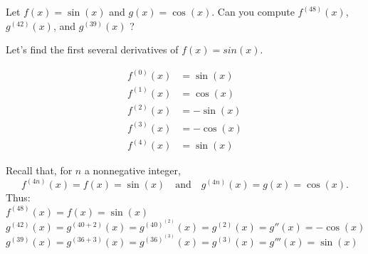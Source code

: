 \documentclass[nooutcomes]{ximera}
\begin{document}
\begin{problem}
Let $f(x) = \sin(x)$ and $g(x) = \cos(x)$.  Can you compute $f^{(48)}(x)$, $g^{(42)}(x)$, and $g^{(39)}(x)$ ?  

\begin{freeResponse}
Let's find the first several derivatives of $f(x)=sin(x)$.

	\begin{align*}
	f^{(0)}(x)&=\sin(x)\\
	f^{(1)}(x)&=\cos(x)\\
	f^{(2)}(x)&=-\sin(x)\\
	f^{(3)}(x)&=-\cos(x)\\
	f^{(4)}(x)&=\sin(x)
	\end{align*}

  Recall that, for $n$ a nonnegative integer,
  $$f^{(4n)}(x) = f(x) = \sin(x) \quad \text{and} \quad g^{(4n)}(x) = g(x) = \cos(x).$$
  Thus: \\ 
  $f^{(48)}(x) =f(x)= \sin(x)$ \\
 $g^{(42)}(x) =g^{(40+2)}(x)=g^{(40)^{(2)}}(x)= g^{(2)}(x) = g''(x) = - \cos(x)$  \\
$g^{(39)}(x) =g^{(36+3)}(x)=g^{(36)^{(3)}}(x)= g^{(3)}(x) = g'''(x) = \sin(x)$  



\end{freeResponse}

\end{problem}
	


		
\end{document}
